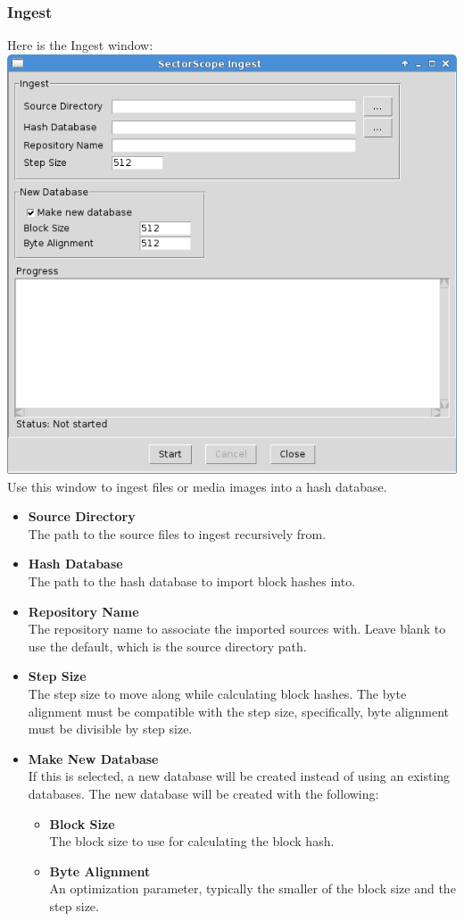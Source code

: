 \documentclass[11pt,fleqn]{article} %
\begin{document}
\subsubsection{Ingest}
Here is the \sscope Ingest window:\\
\includegraphics[scale=.4]{screenshots/ingest}\\
Use this window to ingest files or media images into a hash database.
\begin{itemize}
\item \textbf{Source Directory}\\
The path to the source files to ingest recursively from.
\item \textbf{Hash Database}\\
The path to the hash database to import block hashes into.
\item \textbf{Repository Name}\\
The repository name to associate the imported sources with. Leave blank to use the default, which is the source directory path.
\item \textbf{Step Size}\\
The step size to move along while calculating block hashes. The byte alignment must be compatible with the step size, specifically, byte alignment must be divisible by step size.
\item \textbf{Make New Database}\\
If this is selected, a new database will be created instead of using an existing databases. The new database will be created with the following:
  \begin{itemize}
  \item \textbf{Block Size}\\
  The block size to use for calculating the block hash.
  \item \textbf{Byte Alignment}\\
  An optimization parameter, typically the smaller of the block size and the step size.
  \end{itemize}
\end{itemize}
\end{document}
